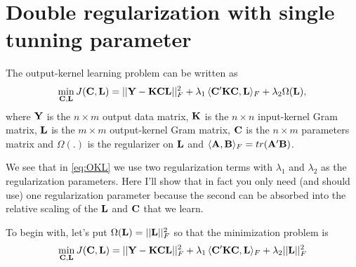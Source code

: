 
\clearpage

\section{Double regularization with single tunning parameter}\label{sec:DoubleRegularization}

The output-kernel learning problem can be written as
\begin{equation}\label{eq:OKL}
 \min_{\mathbf{C},\mathbf{L}} J(\mathbf{C,L}) = || \mathbf{Y} - \mathbf{KCL} ||_F^2 + \lambda_1 \, \langle \mathbf{C'KC}, \mathbf{L}\rangle_F  + \lambda_2 \Omega(\mathbf{L}),
\end{equation}
where $\mathbf{Y}$ is the $n \times m$ output data matrix, $\mathbf{K}$ is the $n \times n$ input-kernel Gram matrix, $\mathbf{L}$ is the $m \times m$ output-kernel Gram matrix, $\mathbf{C}$ is the $n \times m$ parameters matrix and $\Omega(.)$ is the regularizer on $\mathbf{L}$ and $\langle \mathbf{A}, \mathbf{B}\rangle_F = tr(\mathbf{A'B})$.

We see that in \eqref{eq:OKL} we use two regularization terms with $\lambda_1$ and $\lambda_2$ as the regularization parameters. Here I'll show that in fact you only need (and should use) one regularization parameter because the second can be absorbed into the relative scaling of the $\mathbf{L}$ and $\mathbf{C}$ that we learn.

To begin with, let's put $\Omega(\mathbf{L}) = ||\mathbf{L}||_F^2$ so that the minimization problem is
\begin{equation}\label{eq:OKL1}
 \min_{\mathbf{C},\mathbf{L}} J(\mathbf{C,L}) 
 = || \mathbf{Y} - \mathbf{KCL} ||_F^2 + \lambda_1 \, \langle \mathbf{C'KC}, \mathbf{L}\rangle_F  
 + \lambda_2 ||\mathbf{L}||_F^2
\end{equation}

